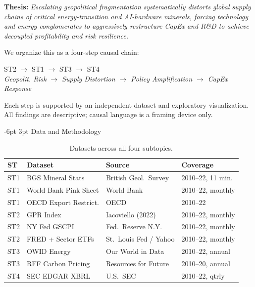 \documentclass[10pt,twocolumn,letterpaper]{article}
\makeatletter
\renewcommand\section{\@startsection{section}{1}{\z@}%
  {-6pt \@plus -2pt \@minus -1pt}{3pt \@plus 1pt}%
  {\normalfont\normalsize\bfseries\color{accent}}}
\makeatother
\begin{document}
\textbf{Thesis:} \textit{Escalating geopolitical fragmentation systematically distorts global
supply chains of critical energy-transition and AI-hardware minerals, forcing technology and
energy conglomerates to aggressively restructure CapEx and R\&D to achieve decoupled
profitability and risk resilience.}

We organize this as a four-step causal chain:
\begin{center}
\small
ST2 $\!\rightarrow\!$ ST1 $\!\rightarrow\!$ ST3 $\!\rightarrow\!$ ST4
\\[0.2em]
\textit{Geopolit. Risk $\to$ Supply Distortion $\to$ Policy Amplification $\to$ CapEx Response}
\end{center}

Each step is supported by an independent dataset and exploratory visualization. All findings are
descriptive; causal language is a framing device only.

\section{Data and Methodology}

\begin{table}[htbp]
\centering
\caption{Datasets across all four subtopics.}
\label{tab:data}
\scriptsize
\setlength{\tabcolsep}{3pt}
\begin{tabular}{llp{2.2cm}l}
\toprule
\textbf{ST} & \textbf{Dataset} & \textbf{Source} & \textbf{Coverage} \\
\midrule
ST1 & BGS Mineral Stats    & British Geol.\ Survey    & 2010--22, 11 min. \\
ST1 & World Bank Pink Sheet & World Bank              & 2010--22, monthly \\
ST1 & OECD Export Restrict. & OECD                   & 2010--22          \\
ST2 & GPR Index             & Iacoviello (2022)       & 2010--22, monthly \\
ST2 & NY Fed GSCPI          & Fed.\ Reserve N.Y.      & 2010--22, monthly \\
ST2 & FRED + Sector ETFs    & St.\ Louis Fed / Yahoo  & 2010--22, monthly \\
ST3 & OWID Energy           & Our World in Data       & 2010--22, annual  \\
ST3 & RFF Carbon Pricing    & Resources for Future    & 2010--20, annual  \\
ST4 & SEC EDGAR XBRL        & U.S.\ SEC               & 2010--22, qtrly   \\
\bottomrule
\end{tabular}
\end{table}
\end{document}
